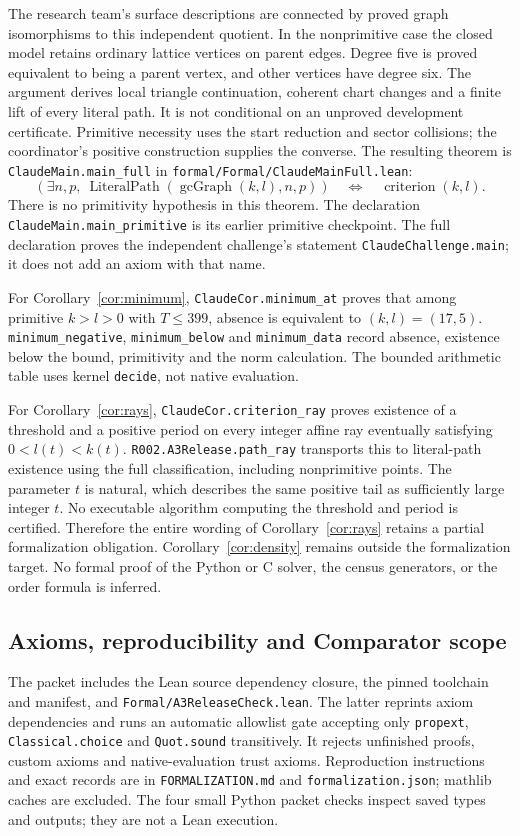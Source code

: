 \documentclass[11pt]{amsart}
\newcommand{\record}[1]{\nolinkurl{#1}}
\begin{document}
The research team's surface descriptions are connected by proved
graph isomorphisms to this independent quotient. In the nonprimitive
case the closed model retains ordinary lattice vertices on parent
edges. Degree five is proved equivalent to being a parent vertex,
and other vertices have degree six. The argument derives local
triangle continuation, coherent chart changes and a finite lift of
every literal path. It is not conditional on an unproved development
certificate. Primitive necessity uses the start reduction and sector
collisions; the coordinator's positive construction supplies the
converse. The resulting theorem is
\record{ClaudeMain.main_full} in
\record{formal/Formal/ClaudeMainFull.lean}:
\[
 (\exists n,p,\ \operatorname{LiteralPath}(\operatorname{gcGraph}(k,l),n,p))
 \quad\Longleftrightarrow\quad \operatorname{criterion}(k,l).
\]
There is no primitivity hypothesis in this theorem. The declaration
\record{ClaudeMain.main_primitive} is its earlier primitive checkpoint.
The full declaration proves the independent challenge's statement
\record{ClaudeChallenge.main}; it does not add an axiom with that name.

For Corollary~\ref{cor:minimum},
\record{ClaudeCor.minimum_at} proves that among primitive $k>l>0$
with $T\le399$, absence is equivalent to $(k,l)=(17,5)$.
\record{minimum_negative}, \record{minimum_below} and
\record{minimum_data} record absence, existence below the bound,
primitivity and the norm calculation. The bounded arithmetic table
uses kernel \record{decide}, not native evaluation.

For Corollary~\ref{cor:rays}, \record{ClaudeCor.criterion_ray}
proves existence of a threshold and a positive period on every
integer affine ray eventually satisfying $0<l(t)<k(t)$.
\record{R002.A3Release.path_ray} transports this to literal-path
existence using the full classification, including nonprimitive
points. The parameter $t$ is natural, which describes the same
positive tail as sufficiently large integer $t$. No executable
algorithm computing the threshold and period is certified. Therefore
the entire wording of Corollary~\ref{cor:rays} retains a partial
formalization obligation. Corollary~\ref{cor:density} remains outside
the formalization target. No formal proof of the Python or C solver,
the census generators, or the order formula is inferred.

\subsection{Axioms, reproducibility and Comparator scope}
The packet includes the Lean source dependency closure, the pinned
toolchain and manifest, and \record{Formal/A3ReleaseCheck.lean}.
The latter reprints axiom dependencies and runs an automatic
allowlist gate accepting only \record{propext},
\record{Classical.choice} and \record{Quot.sound} transitively.
It rejects unfinished proofs, custom axioms and native-evaluation
trust axioms. Reproduction instructions and exact records are in
\record{FORMALIZATION.md} and \record{formalization.json}; mathlib
caches are excluded. The four small Python packet checks inspect
saved types and outputs; they are not a Lean execution.
\end{document}
